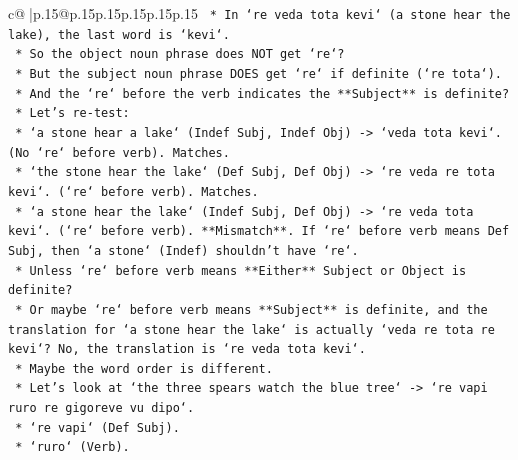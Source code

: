 \documentclass{article}
\begin{document}
{\begin{supertabular}{c@{$\;$}|p{.15\linewidth}@{}p{.15\linewidth}p{.15\linewidth}p{.15\linewidth}p{.15\linewidth}p{.15\linewidth}}
{{{\texttt{                                                        *   In `re veda tota kevi` (a stone hear the lake), the last word is `kevi`.} \\
\texttt{                                                        *   So the object noun phrase does NOT get `re`?} \\
\texttt{                                                        *   But the subject noun phrase DOES get `re` if definite (`re tota`).} \\
\texttt{                                                        *   And the `re` before the verb indicates the **Subject** is definite?} \\
\texttt{                                                        *   Let's re{-}test:} \\
\texttt{                                                            *   `a stone hear a lake` (Indef Subj, Indef Obj) {-}> `veda tota kevi`. (No `re` before verb). Matches.} \\
\texttt{                                                            *   `the stone hear the lake` (Def Subj, Def Obj) {-}> `re veda re tota kevi`. (`re` before verb). Matches.} \\
\texttt{                                                            *   `a stone hear the lake` (Indef Subj, Def Obj) {-}> `re veda tota kevi`. (`re` before verb). **Mismatch**. If `re` before verb means Def Subj, then `a stone` (Indef) shouldn't have `re`.} \\
\texttt{                                                            *   Unless `re` before verb means **Either** Subject or Object is definite?} \\
\texttt{                                                            *   Or maybe `re` before verb means **Subject** is definite, and the translation for `a stone hear the lake` is actually `veda re tota re kevi`? No, the translation is `re veda tota kevi`.} \\
\texttt{                                                            *   Maybe the word order is different.} \\
\texttt{                                                            *   Let's look at `the three spears watch the blue tree` {-}> `re vapi ruro re gigoreve vu dipo`.} \\
\texttt{                                                                *   `re vapi` (Def Subj).} \\
\texttt{                                                                *   `ruro` (Verb).} \\
}}}
\end{supertabular}}
\end{document}
